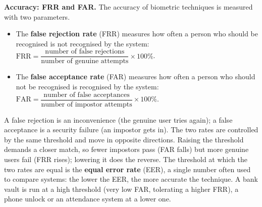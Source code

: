 \textbf{Accuracy: FRR and FAR.} The accuracy of biometric techniques is measured with two parameters.
\begin{itemize}
  \item The \textbf{false rejection rate} (FRR) measures how often a person who should be recognised is not recognised by the system: $\mathrm{FRR} = \dfrac{\text{number of false rejections}}{\text{number of genuine attempts}} \times 100\%$.
  \item The \textbf{false acceptance rate} (FAR) measures how often a person who should not be recognised is recognised by the system: $\mathrm{FAR} = \dfrac{\text{number of false acceptances}}{\text{number of impostor attempts}} \times 100\%$.
\end{itemize}
A false rejection is an inconvenience (the genuine user tries again); a false acceptance is a security failure (an impostor gets in). The two rates are controlled by the same threshold and move in opposite directions. Raising the threshold demands a closer match, so fewer impostors pass (FAR falls) but more genuine users fail (FRR rises); lowering it does the reverse. The threshold at which the two rates are equal is the \textbf{equal error rate} (EER), a single number often used to compare systems: the lower the EER, the more accurate the technique. A bank vault is run at a high threshold (very low FAR, tolerating a higher FRR), a phone unlock or an attendance system at a lower one.
\begin{center}
\end{center}


